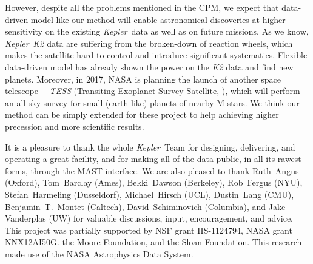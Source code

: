 \documentclass[12pt, preprint]{aastex}
\newcommand{\project}[1]{\textsl{#1}}
\newcommand{\Kepler}{\project{Kepler}}
\newcommand{\name}{CPM}
\begin{document}
However, despite all the problems mentioned in the \name,
  we expect that data-driven model like our method will enable astronomical discoveries 
  at higher sensitivity on the existing \Kepler\ data as well as on future missions.  
As we know, \Kepler\ \project{K2} \citep{k2} data are suffering from the broken-down of reaction wheels, 
  which makes the satellite hard to control and introduce significant systematics. 
Flexible data-driven model \citep{dfm} has already shown the power on the \project{K2} data 
  and find new planets.
Moreover, in 2017, NASA is planning the launch of another space telescope---
  \project{TESS} (Transiting Exoplanet Survey Satellite, \cite{tess}), 
  which will perform an all-sky survey for small (earth-like) planets of nearby M stars. 
  We think our method can be simply extended for these project to help achieving higher precession and more scientific results. 


\acknowledgements
It is a pleasure to thank the whole \Kepler\ Team
  for designing, delivering, and operating a great facility,
  and for making all of the data public, in all its rawest forms, through the MAST interface.
We are also pleased to thank
  Ruth~Angus (Oxford),
  Tom~Barclay (Ames),
  Bekki~Dawson (Berkeley),
  Rob~Fergus (NYU),
  Stefan~Harmeling (Dusseldorf),
  Michael~Hirsch (UCL),
  Dustin~Lang (CMU),
  Benjamin~T.~Montet (Caltech),
  David~Schiminovich (Columbia),
  and
  Jake Vanderplas (UW)
for valuable discussions, input, encouragement, and advice.
This project was partially supported by
  NSF grant IIS-1124794,
  NASA grant NNX12AI50G.
  the Moore Foundation,
  and
  the Sloan Foundation.
This research made use of the NASA Astrophysics Data System.

\clearpage


\end{document}
